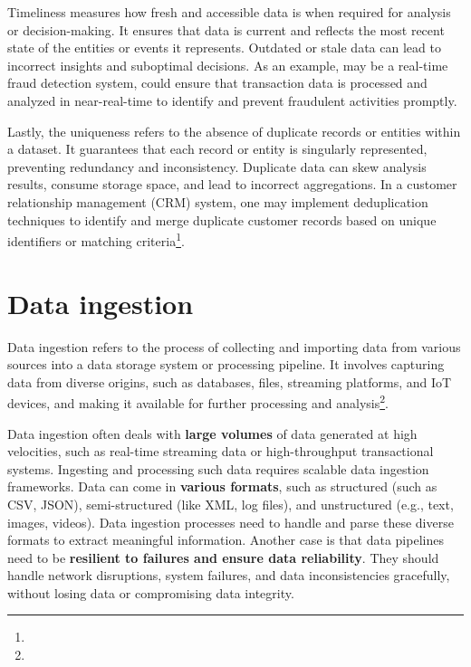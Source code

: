 Timeliness measures how fresh and accessible data is when required for analysis or decision-making. It ensures that data is current and reflects the most recent state of the entities or events it represents. Outdated or stale data can lead to incorrect insights and suboptimal decisions. As an example, may be a real-time fraud detection system, could ensure that transaction data is processed and analyzed in near-real-time to identify and prevent fraudulent activities promptly\footnotemark[19].

Lastly, the uniqueness refers to the absence of duplicate records or entities within a dataset. It guarantees that each record or entity is singularly represented, preventing redundancy and inconsistency. Duplicate data can skew analysis results, consume storage space, and lead to incorrect aggregations. In a customer relationship management (CRM) system, one may implement deduplication techniques to identify and merge duplicate customer records based on unique identifiers or matching criteria\footnote[19]{}.

\section{Data ingestion}

Data ingestion refers to the process of collecting and importing data from various sources into a data storage system or processing pipeline. It involves capturing data from diverse origins, such as databases, files, streaming platforms, and IoT devices, and making it available for further processing and analysis\footnote[16]{}.

Data ingestion often deals with \textbf{large volumes} of data generated at high velocities, such as real-time streaming data or high-throughput transactional systems. Ingesting and processing such data requires scalable data ingestion frameworks. Data can come in \textbf{various formats}, such as structured (such as CSV, JSON), semi-structured (like XML, log files), and unstructured (e.g., text, images, videos). Data ingestion processes need to handle and parse these diverse formats to extract meaningful information. Another case is that data pipelines need to be \textbf{resilient to failures and ensure data reliability}. They should handle network disruptions, system failures, and data inconsistencies gracefully, without losing data or compromising data integrity\footnotemark[16].


